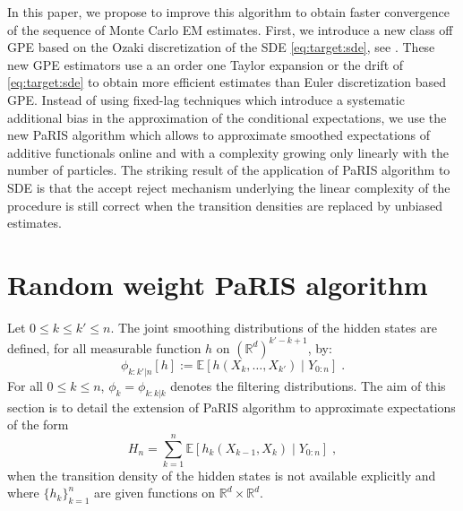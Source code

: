 \documentclass[12pt]{article}
\newcommand{\eqsp}{\;}
\newcommand{\1}{\mathrm{1}}
\begin{document}
In this paper, we propose to improve this algorithm to obtain faster convergence of the sequence of Monte Carlo EM estimates. First, we introduce a new class off GPE based on the Ozaki discretization of the SDE  \eqref{eq:target:sde}, see \cite{ozaki:1992,shoji:ozaki:1998}. 
These new GPE estimators use a an order one Taylor expansion or the drift of \eqref{eq:target:sde} to obtain more efficient estimates than Euler discretization based GPE. Instead of using fixed-lag techniques which introduce a systematic additional bias  in the approximation of the conditional expectations, we use the new PaRIS algorithm which allows to approximate smoothed expectations of additive functionals online and with a complexity growing only linearly with the number of particles. The striking result of the application of PaRIS algorithm to SDE is that the accept reject mechanism underlying the linear complexity of the procedure is still correct when the transition densities are replaced by unbiased estimates.

\section{Random weight PaRIS algorithm}
Let $0 \leq k \leq k' \leq n$. The joint smoothing distributions of the hidden states are defined, for all measurable function $h$ on $(\mathbb{R}^d)^{k'-k + 1}$, by:
\[
\phi_{k:k'|n}[h] := \mathbb{E}\left[h(X_k,\ldots,X_{k'})\middle|Y_{0:n}\right]\eqsp.
\]
For all $0\le k\le n$, $\phi_{k} = \phi_{k:k|k}$ denotes the filtering distributions. The aim of this section is to detail the extension of PaRIS algorithm to approximate expectations of the form
\begin{equation}
\label{def:addfunc}
H_{n} =  \sum_{k=1}^n\mathbb{E}\left[h_k(X_{k-1},X_k)\middle|Y_{0:n}\right]\eqsp,
\end{equation}
when the transition density of the hidden states is not available explicitly and where $\{h_k\}_{k=1}^n$ are given functions on $\mathbb{R}^d\times \mathbb{R}^d$.  %
\end{document}
